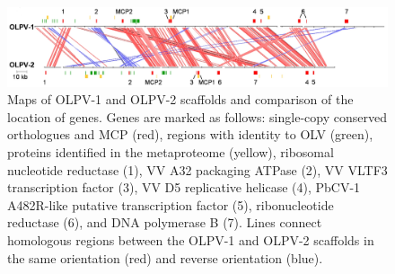 \begin{figure}
\includegraphics[width=\textwidth]{olv_figures/OLPV_genome.jpg}
\caption[Maps of \acs{OLPV} genomic scaffolds]{Maps of \acs{OLPV}-1 and \acs{OLPV}-2 scaffolds and comparison of the location of genes. Genes are marked as follows: single-copy conserved orthologues and \acs{MCP} (red), regions with identity to \acs{OLV} (green), proteins identified in the metaproteome (yellow), ribosomal nucleotide reductase \textbeta{} (1), VV A32 packaging ATPase (2), VV VLTF3 transcription factor (3), VV D5 replicative helicase (4), PbCV-1 A482R-like putative transcription factor (5), ribonucleotide reductase \textalpha{} (6), and \textsc{DNA} polymerase B (7). Lines connect homologous regions between the \ac{OLPV}-1 and \ac{OLPV}-2 scaffolds in the same orientation (red) and reverse orientation (blue).
}
\label{fig:OLPV_genome}

\end{figure}
